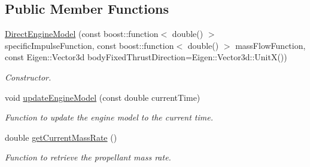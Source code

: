 \subsection*{Public Member Functions}
\begin{DoxyCompactItemize}
\item 
\hyperlink{classtudat_1_1system__models_1_1DirectEngineModel_ab92178b1ea762482bcf1ba15724387b4}{Direct\+Engine\+Model} (const boost\+::function$<$ double() $>$ specific\+Impulse\+Function, const boost\+::function$<$ double() $>$ mass\+Flow\+Function, const Eigen\+::\+Vector3d body\+Fixed\+Thrust\+Direction=Eigen\+::\+Vector3d\+::\+UnitX())
\begin{DoxyCompactList}\small\item\em Constructor. \end{DoxyCompactList}\item 
void \hyperlink{classtudat_1_1system__models_1_1DirectEngineModel_aa0feefd12642c98463d84bb0d84128b7}{update\+Engine\+Model} (const double current\+Time)
\begin{DoxyCompactList}\small\item\em Function to update the engine model to the current time. \end{DoxyCompactList}\item 
double \hyperlink{classtudat_1_1system__models_1_1DirectEngineModel_add81d20ccdbf76fe5850b52cfb703e3a}{get\+Current\+Mass\+Rate} ()
\begin{DoxyCompactList}\small\item\em Function to retrieve the propellant mass rate. \end{DoxyCompactList}\end{DoxyCompactItemize}
